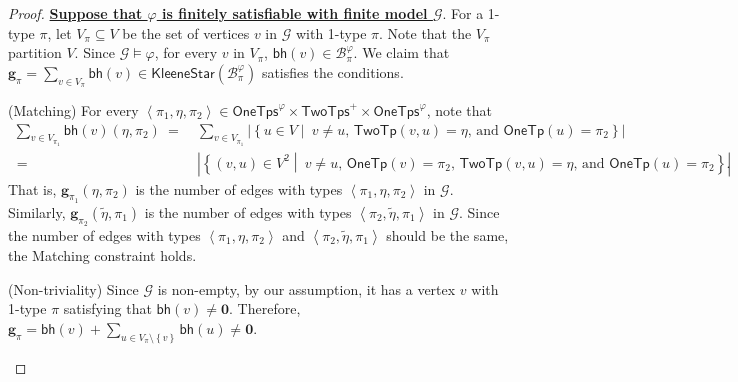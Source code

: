 \documentclass[10pt,a4paper]{article}
\theoremstyle{definition}
\theoremstyle{remark}
\newcommand{\cB}{\mathcal{B}}
\newcommand{\cG}{\mathcal{G}}
\newcommand{\bfg}{\mathbf{g}}
\newcommand{\bfzero}{\mathbf{0}}
\newcommand{\onetypeof}{\mathsf{OneTp}}
\newcommand{\twotypeof}{\mathsf{TwoTp}}
\newcommand{\twotypes}{\mathsf{TwoTps}}
\newcommand{\Onetypes}{\mathsf{OneTps}}
\newcommand{\set}[1]         {\left\{ #1 \right\}}
\newcommand{\setc}[2]        {\left\{ #1 \middle|\  #2 \right\}}
\newcommand{\tuple}[1]       {\left\langle #1 \right\rangle}
\newcommand{\abs}[1]         {{\left| #1 \right|}}
\newcommand{\dual}[1] {\widetilde{ #1 }}
\newcommand{\bh}[1] {\mathsf{bh}\left( #1 \right)}
\newcommand{\kstar}[1] {\mathsf{KleeneStar}\left( #1 \right)}
\begin{document}
\begin{proof}
    \textbf{\uline{Suppose that $\varphi$ is finitely satisfiable with finite model $\cG$}}.
    For a 1-type $\pi$,
    let $V_\pi \subseteq V$ be the set of vertices $v$ in $\cG$ with 1-type $\pi$.
    Note that the $V_\pi$ partition $V$.
    Since $\cG \models \varphi$, for every $v$ in $V_\pi$,
    $\bh{v} \in \cB^\varphi_\pi$.
    We claim that $\bfg_\pi = \sum_{v \in V_\pi} \bh{v} \in \kstar{\cB^\varphi_\pi}$ satisfies the conditions.

    \begin{compactitem}
        \item (Matching) 
        For every $\tuple{\pi_1, \eta, \pi_2} \in \Onetypes^\varphi \times \twotypes^+ \times \Onetypes^\varphi$,
        note that
        \begin{equation*}
            \begin{aligned}
                \sum_{v \in V_{\pi_1}} \bh{v}(\eta, \pi_2)
                \ =\ &
                \sum_{v \in V_{\pi_1}}
                \abs{\setc{u \in V}{\text{$v \neq u$, $\twotypeof(v, u) = \eta$, and $\onetypeof(u) = \pi_2$}}} \\
                \ =\ &
                \abs{\setc{(v, u) \in V^2}{\text{$v \neq u$, $\onetypeof(v) = \pi_2$, $\twotypeof(v, u) = \eta$, and $\onetypeof(u) = \pi_2$}}}.
            \end{aligned}
        \end{equation*}
        That is, $\bfg_{\pi_1}(\eta, \pi_2)$ is the number of edges with types $\tuple{\pi_1, \eta, \pi_2}$ in $\cG$.
        Similarly, $\bfg_{\pi_2}(\dual{\eta}, \pi_1)$ is the number of edges with types $\tuple{\pi_2, \dual{\eta}, \pi_1}$ in $\cG$.
        Since the number of edges with types $\tuple{\pi_1, \eta, \pi_2}$ and $\tuple{\pi_2, \dual{\eta}, \pi_1}$ should be the same, the Matching constraint holds.
        \item (Non-triviality)
        Since $\cG$ is non-empty, by our assumption,
        it has a vertex $v$ with 1-type $\pi$ satisfying that $\bh{v} \neq \bfzero$.
        Therefore,
        $\bfg_{\pi} = \bh{v} + \sum_{u \in V_{\pi} \setminus \set{v}} \bh{u} \neq \bfzero$.
    \end{compactitem}


\end{proof}
\end{document}

